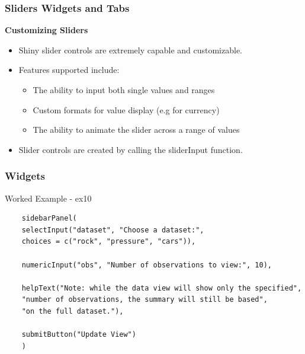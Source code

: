 \documentclass{beamer}
\begin{document}
\begin{frame}
	\frametitle{Sliders Widgets and Tabs}
\textbf{Customizing Sliders}
\begin{itemize}
\item Shiny slider controls are extremely capable and customizable.
\item Features supported include:
	\begin{itemize}
	\item The ability to input both single values and ranges
	\item Custom formats for value display (e.g for currency)
	\item The ability to animate the slider across a range of values
	\end{itemize}
	\item Slider controls are created by calling the sliderInput function. 
\end{itemize}
\end{frame}
\begin{frame}[fragile]
	\frametitle{Widgets}
Worked Example  - ex10
	\begin{verbatim}
	sidebarPanel(
	selectInput("dataset", "Choose a dataset:", 
	choices = c("rock", "pressure", "cars")),
	
	numericInput("obs", "Number of observations to view:", 10),
	
	helpText("Note: while the data view will show only the specified",
	"number of observations, the summary will still be based",
	"on the full dataset."),
	
	submitButton("Update View")
	)
	\end{verbatim}
\end{frame}
%	
\end{document}
